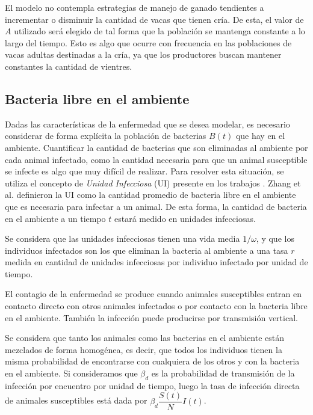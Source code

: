 \documentclass[12pt,preprint,times]{elsarticle}
\begin{document}
El modelo no contempla estrategias de manejo de ganado tendientes a incrementar o disminuir la cantidad de vacas que tienen cría. De esta, el valor de $A$ utilizado será elegido de tal forma que la población se mantenga constante a lo largo del tiempo. Esto es algo que ocurre con frecuencia en las poblaciones de vacas adultas destinadas a la cría, ya que los productores buscan mantener constantes la cantidad de vientres. 


\subsection{Bacteria libre en el ambiente}

Dadas las características de la enfermedad que se desea modelar, es necesario considerar de forma explícita la población de bacterias $B(t)$ que hay en el ambiente. Cuantificar la cantidad de bacterias que son eliminadas al ambiente por cada animal infectado, como la cantidad necesaria para que un animal susceptible se infecte es algo que muy difícil de realizar. Para resolver esta situación, se utiliza el concepto de \textit{Unidad Infecciosa} (UI) presente en los trabajos \cite{hou2013, zhang2014prediction}. Zhang et al. definieron la UI como la cantidad promedio de bacteria libre en el ambiente que es necesaria para infectar a un animal. De esta forma, la cantidad de bacteria en el ambiente a un tiempo $t$ estará medido en unidades infecciosas. 

Se considera que las unidades infecciosas tienen una vida media $1 / \omega$, y que los individuos infectados son los que eliminan la bacteria al ambiente a una tasa $r$ medida en cantidad de unidades infecciosas por individuo infectado por unidad de tiempo.  

El contagio de la enfermedad se produce cuando  animales susceptibles  entran en  contacto directo con otros animales infectados o por  contacto con la bacteria libre en el ambiente. También la infección puede producirse por  transmisión vertical.  

Se considera que tanto los animales como las bacterias en el ambiente están mezclados de forma homogénea, es decir, que todos los individuos tienen la misma probabilidad de encontrarse con cualquiera de los otros y con la bacteria en el ambiente. Si consideramos que $\beta_d$ es la probabilidad de transmisión de la infección por encuentro por unidad de tiempo, luego la tasa de infección directa de animales susceptibles está dada por $\beta_d \dfrac{S(t)}{N}I(t)$. 
\end{document}

